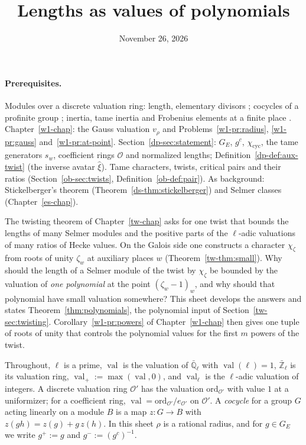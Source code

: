 \documentclass[reqno]{amsart}
\title{Lengths as values of polynomials}
\author{}
\date{November 26, 2026}
\newcounter{chap}
\theoremstyle{definition}
\theoremstyle{plain}
\newcommand{\Ql}{\bar{\mathbb{Q}}_\ell}
\newcommand{\Zl}{\bar{\mathbb{Z}}_\ell}
\newcommand{\val}{\operatorname{val}}
\newcommand{\ord}{\mathrm{ord}}
\newcommand{\Oc}{\mathcal{O}}
\begin{document}
\maketitle
{}\label{chap}

\paragraph{Prerequisites.}
Modules over a discrete valuation ring: length, elementary divisors \cite[III, \S7]{La}; cocycles of a profinite group \cite[Ch.~VII, \S3 and Ch.~X, \S3]{SLF}; inertia, tame inertia and Frobenius elements at a finite place \cite[Ch.~I, \S8 and Ch.~IV, \S\S1--2]{SLF}.  Chapter~\ref{w1-chap}: the Gauss valuation \(v_\rho\) and Problems~\ref{w1-pr:radius}, \ref{w1-pr:gauss} and~\ref{w1-pr:at-point}.  Section~\ref{dp-sec:statement}: \(G_E\), \(g^c\), \(\chi_{\mathrm{cyc}}\), the tame generators \(s_w\), coefficient rings \(\Oc\) and normalized lengths; Definition~\ref{dp-def:aux-twist} (the inverse avatar \(\hat\xi\)).  Tame characters, twists, critical pairs and their ratios (Section~\ref{ob-sec:twists}, Definition~\ref{ob-def:pair}).  As background: Stickelberger's theorem (Theorem~\ref{ds-thm:stickelberger}) and Selmer classes (Chapter~\ref{es-chap}).

\medskip
The twisting theorem of Chapter~\ref{tw-chap} asks for one twist that bounds the lengths of many Selmer modules and the positive parts of the \(\ell\)-adic valuations of many ratios of Hecke values.  On the Galois side one constructs a character \(\chi_\zeta\) from roots of unity \(\zeta_w\) at auxiliary places \(w\) (Theorem~\ref{tw-thm:small}).  Why should the length of a Selmer module of the twist by \(\chi_\zeta\) be bounded by the valuation of \emph{one polynomial} at the point \((\zeta_w - 1)_w\), and why should that polynomial have small valuation somewhere?  This sheet develops the answers and states Theorem~\ref{thm:polynomials}, the polynomial input of Section~\ref{tw-sec:twisting}.  Corollary~\ref{w1-pr:powers} of Chapter~\ref{w1-chap} then gives one tuple of roots of unity that controls the polynomial values for the first \(m\) powers of the twist.

Throughout, \(\ell\) is a prime, \(\val\) is the valuation of \(\Ql\) with \(\val(\ell) = 1\), \(\Zl\) is its valuation ring, \(\val_+ := \max(\val, 0)\), and \(\val_\ell\) is the \(\ell\)-adic valuation of integers.  A discrete valuation ring \(\Oc'\) has the valuation \(\ord_{\Oc'}\) with value \(1\) at a uniformizer; for a coefficient ring, \(\val = \ord_{\Oc'}/e_{\Oc'}\) on \(\Oc'\).  A \emph{cocycle} for a group \(G\) acting linearly on a module \(B\) is a map \(z \colon G \to B\) with \(z(gh) = z(g) + g\,z(h)\).  In this sheet \(\rho\) is a rational radius, and for \(g \in G_E\) we write \(g^{+} := g\) and \(g^{-} := (g^c)^{-1}\).
\end{document}
